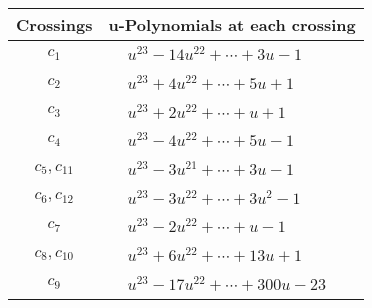 \documentclass[1p]{elsarticle_modified}
\theoremstyle{definition}
\begin{document}
\begin{tabular}{m{50pt}|m{274pt}}
Crossings & \hspace{64pt}u-Polynomials at each crossing \\
\hline $$\begin{aligned}c_{1}\end{aligned}$$&$\begin{aligned}
&u^{23}-14 u^{22}+\cdots+3 u-1
\end{aligned}$\\
\hline $$\begin{aligned}c_{2}\end{aligned}$$&$\begin{aligned}
&u^{23}+4 u^{22}+\cdots+5 u+1
\end{aligned}$\\
\hline $$\begin{aligned}c_{3}\end{aligned}$$&$\begin{aligned}
&u^{23}+2 u^{22}+\cdots+u+1
\end{aligned}$\\
\hline $$\begin{aligned}c_{4}\end{aligned}$$&$\begin{aligned}
&u^{23}-4 u^{22}+\cdots+5 u-1
\end{aligned}$\\
\hline $$\begin{aligned}c_{5},c_{11}\end{aligned}$$&$\begin{aligned}
&u^{23}-3 u^{21}+\cdots+3 u-1
\end{aligned}$\\
\hline $$\begin{aligned}c_{6},c_{12}\end{aligned}$$&$\begin{aligned}
&u^{23}-3 u^{22}+\cdots+3 u^2-1
\end{aligned}$\\
\hline $$\begin{aligned}c_{7}\end{aligned}$$&$\begin{aligned}
&u^{23}-2 u^{22}+\cdots+u-1
\end{aligned}$\\
\hline $$\begin{aligned}c_{8},c_{10}\end{aligned}$$&$\begin{aligned}
&u^{23}+6 u^{22}+\cdots+13 u+1
\end{aligned}$\\
\hline $$\begin{aligned}c_{9}\end{aligned}$$&$\begin{aligned}
&u^{23}-17 u^{22}+\cdots+300 u-23
\end{aligned}$\\
\hline
\end{tabular}\\~\\
\end{document}
